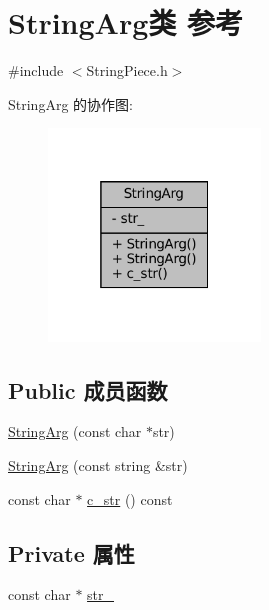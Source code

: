 \hypertarget{classmuduo_1_1StringArg}{}\section{String\+Arg类 参考}
\label{classmuduo_1_1StringArg}


{\ttfamily \#include $<$String\+Piece.\+h$>$}



String\+Arg 的协作图\+:
\nopagebreak
\begin{figure}[H]
\begin{center}
\leavevmode
\includegraphics[width=160pt]{classmuduo_1_1StringArg__coll__graph}
\end{center}
\end{figure}
\subsection*{Public 成员函数}
\begin{DoxyCompactItemize}
\item 
\hyperlink{classmuduo_1_1StringArg_a1be46971883a89d096eb537b2b4b289e}{String\+Arg} (const char $\ast$str)
\item 
\hyperlink{classmuduo_1_1StringArg_ad7592b760513b12bbe0e537fc89c2d30}{String\+Arg} (const string \&str)
\item 
const char $\ast$ \hyperlink{classmuduo_1_1StringArg_a14989d8fe448c5f947832aea3dae615a}{c\+\_\+str} () const
\end{DoxyCompactItemize}
\subsection*{Private 属性}
\begin{DoxyCompactItemize}
\item 
const char $\ast$ \hyperlink{classmuduo_1_1StringArg_a66ebb04af391bdd5bf2d55a010875cd0}{str\+\_\+}
\end{DoxyCompactItemize}


